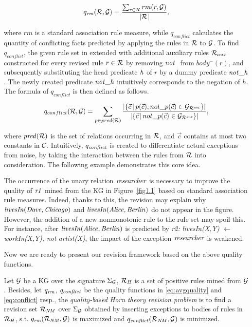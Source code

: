 \begin{equation}
q_{\mathit{rm}}(\mathcal{R},\mathcal{G})=\dfrac{\sum_{r\in \mathcal{R}}rm(r,\mathcal{G})}{|\mathcal{R}|}
\label{eq:avgquality},
\end{equation}

where $rm$ is a standard association rule measure, while $q_{conflict}$ calculates the quantity of conflicting facts predicted by applying the rules in $\mathcal{R}$ to $\mathcal{G}$. To find $q_{conflict}$, the given rule set in extended with additional auxiliary rules $\mathcal{R}_{aux}$ constructed for every revised rule $r \in \mathcal{R}$ by removing $\naf$ from $body^-(r)$, and subsequently substituting the head predicate $\mathit{h}$ of $r$ by a dummy predicate $\mathit{not\_h}$. The newly created predicate $\mathit{not\_h}$ intuitively corresponds to the negation of $h$. The formula of $q_{conflict}$ is then defined as follows.

\begin{equation}
q_{conflict}(\mathcal{R},\mathcal{G})=\sum_{p\in pred(\mathcal{R})} \dfrac{|\{ \vec{c}\,|\,p(\vec{c}),not\_p(\vec{c})\in \mathcal{G}_{\mathcal{R}^{\mathit{aux}}}\} |}{|\{ \vec{c}\,|\,not\_p(\vec{c})\in \mathcal{G}_{\mathcal{R}^{\mathit{aux}}}\} |}
\label{eq:conflict},
\end{equation}

where $\mathit{pred(\mathcal{R})}$ is the set of relations occurring in $\mathcal{R}$, and $\vec{c}$ contains at most two constants in $\mathcal{C}$. Intuitively, $q_{\mathit{conflict}}$ is created to differentiate actual exceptions from noise, by taking the interaction between the rules from $\mathcal{R}$ into consideration. The following example demonstrates this core idea.

\begin{example}

The occurrence of the unary relation $\mathit{researcher}$ is necessary to improve the quality of $\mathit{r1}$ mined from the KG in Figure~\ref{fig1.1} based on standard association rule measures. Indeed, thanks to this, the revision may explain why $\mathit{livesIn(Dave,Chicago)}$ and $\mathit{livesIn(Alice,Berlin)}$ do not appear in the figure. However, the addition of a new nonmonotonic rule to the rule set may spoil this. For instance, after $\mathit{livesIn(Alice,Berlin)}$ is predicted by \textit{r2: livesIn(X,Y) $\leftarrow$ workIn(X,Y), not artist(X)}, the impact of the exception $\mathit{researcher}$ is weakened.
\end{example}

Now we are ready to present our revision framework based on the above quality functions.

\begin{definition} \label{def:qhtr}
Let $\mathcal{G}$ be a KG over the signature $\Sigma_{\mathcal{G}}$, $\mathcal{R}_{\mathit{H}}$ is a set of positive rules mined from $\mathcal{G}$. Besides, let $\mathit{q_{rm}}$, $\mathit{q_{conflict}}$ be the quality functions in \ref{eq:avgquality} and \ref{eq:conflict} resp., the \emph{quality-based Horn theory revision problem} is to find a revision set $\mathcal{R}_{\mathit{NM}}$ over $\Sigma_{\mathcal{G}}$ obtained by inserting exceptions to bodies of rules in $\mathcal{R}_{\mathit{H}}$, s.t. $q_{\mathit{rm}}(\mathcal{R}_{\mathit{NM}},\mathcal{G})$ is maximized and $q_{\mathit{conflict}}(\mathcal{R}_{\mathit{NM}},\mathcal{G})$ is minimized.
\end{definition}

